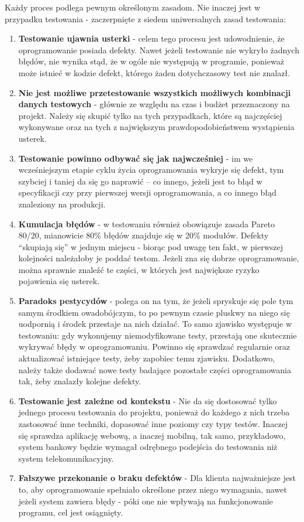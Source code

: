 Każdy proces podlega pewnym określonym zasadom. Nie inaczej jest w przypadku testowania - zaczerpnięte z \cite{istqb} siedem uniwersalnych zasad testowania:
\begin{enumerate}
    \item \textbf{Testowanie ujawnia usterki} - celem tego procesu jest udowodnienie, że oprogramowanie posiada defekty. Nawet jeżeli testowanie nie wykryło żadnych błędów, nie wynika stąd, że w ogóle nie występują w programie, ponieważ może istnieć w kodzie defekt, którego żaden dotychczasowy test nie znalazł.
    \item \textbf{Nie jest możliwe przetestowanie wszystkich możliwych kombinacji danych testowych} - głównie ze względu na czas i budżet przeznaczony na projekt. Należy się skupić tylko na tych przypadkach, które są najczęściej wykonywane oraz na tych z największym prawdopodobieństwem wystąpienia usterek.
    \item \textbf{Testowanie powinno odbywać się jak najwcześniej} - im we wcześniejszym etapie cyklu życia oprogramowania wykryje się defekt, tym szybciej i taniej da się go naprawić – co innego, jeżeli jest to błąd w specyfikacji czy przy pierwszej wersji oprogramowania, a co innego błąd znaleziony na produkcji.
    \item \textbf{Kumulacja błędów} - w testowaniu również obowiązuje zasada Pareto 80/20, mianowicie 80\% błędów znajduje się w 20\% modułów. Defekty “skupiają się” w jednym miejscu - biorąc pod uwagę ten fakt, w pierwszej kolejności należałoby je poddać testom. Jeżeli zna się dobrze oprogramowanie, można sprawnie znaleźć te części, w których jest największe ryzyko pojawienia się usterek. 
    \item \textbf{Paradoks pestycydów} - polega on na tym, że jeżeli spryskuje się pole tym samym środkiem owadobójczym, to po pewnym czasie pluskwy na niego się uodpornią i środek przestaje na nich działać. To samo zjawisko występuje w testowaniu: gdy wykonujemy niemodyfikowane testy, przestają one skutecznie wykrywać błędy w oprogramowaniu. Powinno się sprawdzać regularnie oraz aktualizować istniejące testy, żeby zapobiec temu zjawisku. Dodatkowo, należy także dodawać nowe testy badające pozostałe części oprogramowania tak, żeby znalazły kolejne defekty.
    \item \textbf{Testowanie jest zależne od kontekstu} - Nie da się dostosować tylko jednego procesu testowania do projektu, ponieważ do każdego z nich trzeba zastosować inne techniki, dopasować inne poziomy czy typy testów. Inaczej się sprawdza aplikację webową, a inaczej mobilną, tak samo, przykładowo, system bankowy będzie wymagał odrębnego podejścia do testowania niż system telekomunikacyjny. 
    \item \textbf{Fałszywe przekonanie o braku defektów} - Dla klienta najważniejsze jest to, aby oprogramowanie spełniało określone przez niego wymagania, nawet jeżeli system zawiera błędy - póki one nie wpływają na funkcjonowanie programu, cel jest osiągnięty. 
\end{enumerate}

